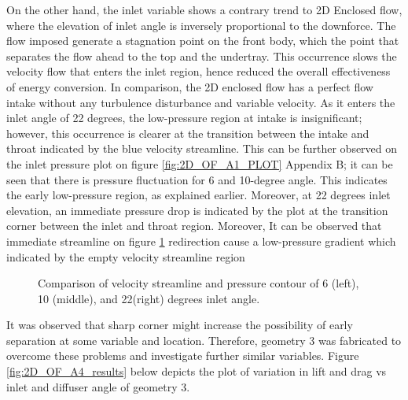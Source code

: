 \noindent On the other hand, the inlet variable shows a contrary trend to 2D Enclosed flow, where the elevation of inlet angle is inversely proportional to the downforce. The flow imposed generate a stagnation point on the front body, which the point that separates the flow ahead to the top and the undertray. This occurrence slows the velocity flow that enters the inlet region, hence reduced the overall effectiveness of energy conversion. In comparison, the 2D enclosed flow has a perfect flow intake without any turbulence disturbance and variable velocity. As it enters the inlet angle of 22 degrees, the low-pressure region at intake is insignificant; however, this occurrence is clearer at the transition between the intake and throat indicated by the blue velocity streamline. This can be further observed on the inlet pressure plot on figure \ref{fig:2D_OF_A1_PLOT} Appendix B; it can be seen that there is pressure fluctuation for 6 and 10-degree angle. This indicates the early low-pressure region, as explained earlier. Moreover, at 22 degrees inlet elevation, an immediate pressure drop is indicated by the plot at the transition corner between the inlet and throat region. Moreover,  It can be observed that immediate streamline on figure \ref{fig:A1_Contour_inlet_compare} redirection cause a low-pressure gradient which indicated by the empty velocity streamline region 

\begin{figure}[!hb]
   \noindent{}
   \caption{Comparison of velocity streamline and pressure contour of 6 (left), 10 (middle), and 22(right) degrees inlet angle. }
   \label{fig:A1_Contour_inlet_compare}
\end{figure}

\noindent It was observed that sharp corner might increase the possibility of early separation at some variable and location. Therefore, geometry 3 was fabricated to overcome these problems and investigate further similar variables. Figure \ref{fig:2D_OF_A4_results} below depicts the plot of variation in lift and drag vs inlet and diffuser angle of geometry 3.

